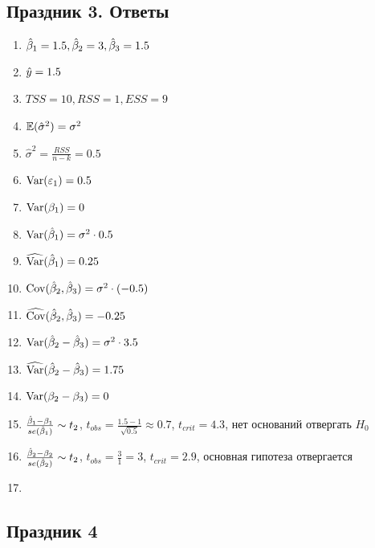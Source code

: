 \documentclass[12pt, a4paper]{article}\usepackage[]{graphicx}\usepackage[]{color}
\begin{document}
\subsection{Праздник 3. Ответы}
\begin{enumerate}
\item $\hat{\beta}_1 = 1.5, \hat{\beta}_2 = 3, \hat{\beta}_3 = 1.5$
\item $\hat{y} = 1.5$
\item $TSS = 10, RSS = 1, ESS = 9$
\item $\mathbb{E} (\hat{\sigma}^2) = \sigma^2$
\item $\hat{\sigma}^2 = \frac{RSS}{n-k} = 0.5$
\item $\operatorname{Var}(\varepsilon_1) = 0.5$
\item $\operatorname{Var} (\beta_1) = 0$
\item $\operatorname{Var} (\hat{\beta}_1) = \sigma^2 \cdot 0.5$
\item $\widehat{\operatorname{Var} }(\hat{\beta}_1) = 0.25$
\item $\operatorname{Cov} (\hat{\beta}_2, \hat{\beta}_3) = \sigma^2 \cdot (-0.5)$
\item $\widehat{\operatorname{Cov} }(\hat{\beta}_2, \hat{\beta}_3) = -0.25$
\item $\operatorname{Var} (\hat{\beta}_2 - \hat{\beta}_3) = \sigma^2 \cdot 3.5$
\item $\widehat{\operatorname{Var} }(\hat{\beta}_2 - \hat{\beta}_3) = 1.75$
\item $\operatorname{Var} (\beta_2 - \beta_3) = 0$
\item $\frac{\hat{\beta}_1 - \beta_1}{se(\hat{\beta}_1)} \sim t_2$, $t_{obs} = \frac{1.5-1}{\sqrt{0.5}} \approx 0.7$, $t_{crit} = 4.3$, нет оснований отвергать $H_0$
\item $\frac{\hat{\beta}_2 - \beta_2}{se(\hat{\beta}_2)} \sim t_2$, $t_{obs} = \frac{3}{1} = 3$, $t_{crit} = 2.9$, основная гипотеза отвергается
\item
\end{enumerate}



\subsection{Праздник 4}
\end{document}
